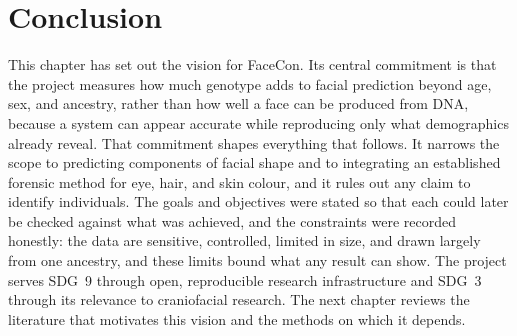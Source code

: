 \section{Conclusion}
This chapter has set out the vision for FaceCon. Its central commitment is that the project measures how much genotype adds to facial prediction beyond age, sex, and ancestry, rather than how well a face can be produced from DNA, because a system can appear accurate while reproducing only what demographics already reveal. That commitment shapes everything that follows. It narrows the scope to predicting components of facial shape and to integrating an established forensic method for eye, hair, and skin colour, and it rules out any claim to identify individuals. The goals and objectives were stated so that each could later be checked against what was achieved, and the constraints were recorded honestly: the data are sensitive, controlled, limited in size, and drawn largely from one ancestry, and these limits bound what any result can show. The project serves SDG~9 through open, reproducible research infrastructure and SDG~3 through its relevance to craniofacial research. The next chapter reviews the literature that motivates this vision and the methods on which it depends.
